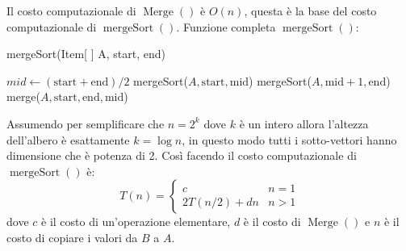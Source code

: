         Il costo computazionale di $ \operatorname{Merge}() $ è $ O(n) $, questa è la base del costo computazionale di $ \operatorname{mergeSort}() $.
        \newpage %
        Funzione completa $ \operatorname{mergeSort}() $:

        \begin{algorithm}
            \caption{mergeSort(Item[ ] A, \Int start, \Int end)}\label{alg:mergeSort}
            \begin{algorithmic}[1]
                    \State \Int $mid \gets (\text{start}+\text{end})/2$
                    \State mergeSort($A,\text{start},\text{mid}$)
                    \State mergeSort($A,\text{mid}+1,\text{end}$)
                    \State merge($A,\text{start},\text{end},\text{mid}$)
                \EndIf
            \end{algorithmic}
        \end{algorithm}

        Assumendo per semplificare che $ n = 2^k $ dove $ k $ è un intero allora l'altezza dell'albero è esattamente $ k = \log n $, in questo modo tutti i sotto-vettori hanno dimensione che è potenza di 2.
        Così facendo il costo computazionale di $ \operatorname{mergeSort}() $ è:
        $$
            T(n)=\begin{cases}
                c & n=1\\
                2T(n/2)+dn & n>1
            \end{cases}
        $$
        dove $ c $ è il costo di un'operazione elementare, $ d $ è il costo di $ \operatorname{Merge}() $ e $ n $ è il costo di copiare i valori da $ B $ a $ A $.